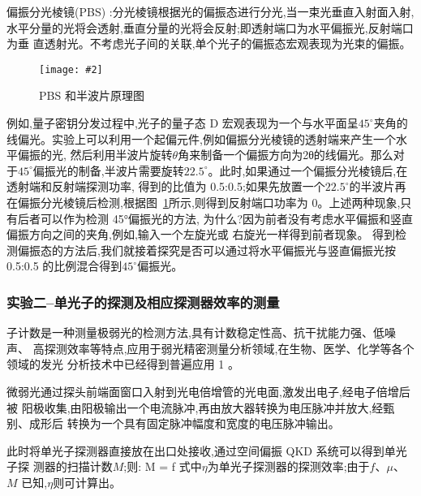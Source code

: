 \documentclass[11pt,a4paper]{ctexart}
\newcommand{\cpic}[2]{
\begin{center}
\texttt{[image: \#2]}
\end{center}
}
\newcommand{\cpicn}[3]
{
\begin{figure}[H]
\cpic{#1}{#2}
\caption{\color{red}#3\label{#2}}
\end{figure}
}
\begin{document}
偏振分光棱镜(PBS)
:分光棱镜根据光的偏振态进行分光,当一束光垂直入射面入射,
水平分量的光将会透射,垂直分量的光将会反射;即透射端口为水平偏振光,反射端口为垂
直透射光。不考虑光子间的关联,单个光子的偏振态宏观表现为光束的偏振。
\cpicn{0.3}{PBS}{PBS 和半波片原理图}
例如,量子密钥分发过程中,光子的量子态 D 宏观表现为一个与水平面呈$45^{\circ}$夹角的线偏光。实验上可以利用一个起偏元件,例如偏振分光棱镜的透射端来产生一个水平偏振的光,
然后利用半波片旋转$\theta$角来制备一个偏振方向为2θ的线偏光。那么对于$45^{\circ}$偏振光的制备,半波片需要旋转$22.5^{\circ}$。此时,如果通过一个偏振分光棱镜后,在透射端和反射端探测功率,
得到的比值为 0.5:0.5;如果先放置一个$22.5^{\circ}$的半波片再在偏振分光棱镜后检测,根据图~\ref{PBS}所示,则得到反射端口功率为 0。上述两种现象,只有后者可以作为检测 45°偏振光的方法,
为什么?因为前者没有考虑水平偏振和竖直偏振方向之间的夹角,例如,输入一个左旋光或
右旋光一样得到前者现象。
得到检测偏振态的方法后,我们就接着探究是否可以通过将水平偏振光与竖直偏振光按
0.5:0.5 的比例混合得到$45^{\circ}$偏振光。


\subsubsection{实验二--单光子的探测及相应探测器效率的测量}
子计数是一种测量极弱光的检测方法,具有计数稳定性高、抗干扰能力强、低噪声、
高探测效率等特点,应用于弱光精密测量分析领域,在生物、医学、化学等各个领域的发光
分析技术中已经得到普遍应用 1 。

微弱光通过探头前端面窗口入射到光电倍增管的光电面,激发出电子,经电子倍增后被
阳极收集,由阳极输出一个电流脉冲,再由放大器转换为电压脉冲并放大,经甄别、成形后
转换为一个具有固定脉冲幅度和宽度的电压脉冲输出。

此时将单光子探测器直接放在出口处接收,通过空间偏振 QKD 系统可以得到单光子探
测器的扫描计数$M$;则:
\beq
M = f\times \mu \times \eta
\eeq
式中$\eta$为单光子探测器的探测效率;由于$f$、$\mu$、$M$ 已知,$\eta$则可计算出。
\end{document}
